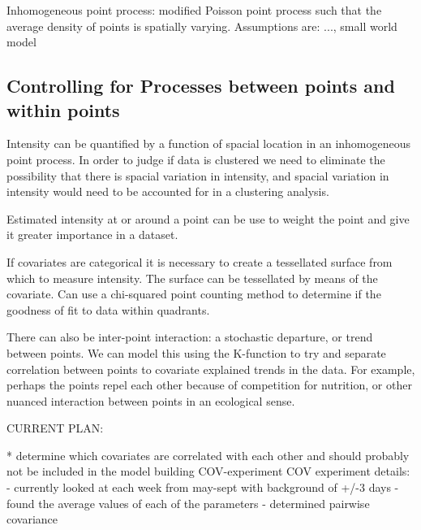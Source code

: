 Inhomogeneous point process: modified Poisson point process such that the average density of points is spatially varying. Assumptions are: ..., small world model \newline

\subsection{Controlling for Processes between points and within points}
Intensity can be quantified by a function of spacial location in an inhomogeneous point process. In order to judge if data is clustered we need to eliminate the possibility that there is spacial variation in intensity, 
and spacial variation in intensity would need to be accounted for in a clustering analysis. \newline


Estimated intensity at or around a point can be use to weight the point and give it greater importance in a dataset. \newline

If covariates are categorical it is necessary to create a tessellated surface from which to measure intensity. The surface can be tessellated by means of the covariate. Can use a chi-squared point counting method to determine if the goodness of fit to data within quadrants. \newline

There can also be inter-point interaction: a stochastic departure, or trend between points. We can model this using the K-function to try and separate correlation between points to covariate explained trends in the data.  
For example, perhaps the points repel each other because of competition for nutrition, or other nuanced interaction between points in an ecological sense. \newline

CURRENT PLAN: \newline

* determine which covariates are correlated with each other and should probably not be included in the model building COV-experiment \newline
COV experiment details: - currently looked at each week from may-sept with background of +/-3 days  -  found the average values of each of the parameters  - determined pairwise covariance \newline

